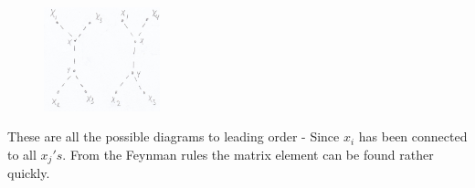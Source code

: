 \begin{example}
\begin{enumerate}
\begin{figure}[H]
			\centering
			\includegraphics[width=0.3\textwidth]{figures/scal3}
		\end{figure}
		These are all the possible diagrams to leading order - Since $x_i$ has been connected to all $x_j's$. From the Feynman rules the matrix element can be found rather quickly.
		
	\end{enumerate}
	
\end{example}

